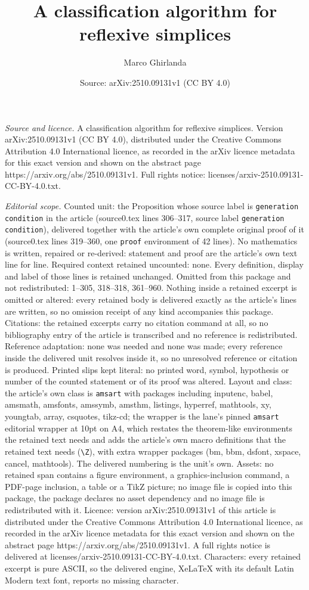 \documentclass[10pt,a4paper]{amsart}
\title[A classification algorithm for reflexive simplices]{A classification algorithm for reflexive simplices}
\author{Marco Ghirlanda}
\date{Source: arXiv:2510.09131v1 (CC BY 4.0)}
\begin{document}
\maketitle

\noindent\emph{Source and licence.} A classification algorithm for reflexive simplices. Version arXiv:2510.09131v1 (CC BY 4.0), distributed under the Creative Commons Attribution 4.0 International licence, as recorded in the arXiv licence metadata for this exact version and shown on the abstract page https://arxiv.org/abs/2510.09131v1. Full rights notice: licenses/arxiv-2510.09131-CC-BY-4.0.txt.\par\smallskip

\noindent\textit{Editorial scope.} Counted unit: the Proposition whose source label is \texttt{generation condition} in the article (source0.tex lines 306--317, source label \texttt{generation condition}), delivered together with the article's own complete original proof of it (source0.tex lines 319--360, one \texttt{proof} environment of 42 lines). No mathematics is written, repaired or re-derived: statement and proof are the article's own text line for line. Required context retained uncounted: none. Every definition, display and label of those lines is retained unchanged. Omitted from this package and not redistributed: 1--305, 318--318, 361--960. Nothing inside a retained excerpt is omitted or altered: every retained body is delivered exactly as the article's lines are written, so no omission receipt of any kind accompanies this package. Citations: the retained excerpts carry no citation command at all, so no bibliography entry of the article is transcribed and no reference is redistributed. Reference adaptation: none was needed and none was made; every reference inside the delivered unit resolves inside it, so no unresolved reference or citation is produced. Printed slips kept literal: no printed word, symbol, hypothesis or number of the counted statement or of its proof was altered. Layout and class: the article's own class is \texttt{amsart} with packages including inputenc, babel, amsmath, amsfonts, amssymb, amsthm, listings, hyperref, mathtools, xy, youngtab, array, csquotes, tikz-cd; the wrapper is the lane's pinned \texttt{amsart} editorial wrapper at 10pt on A4, which restates the theorem-like environments the retained text needs and adds the article's own macro definitions that the retained text needs (\texttt{\textbackslash Z}), with extra wrapper packages (bm, bbm, dsfont, xspace, cancel, mathtools). The delivered numbering is the unit's own. Assets: no retained span contains a figure environment, a graphics-inclusion command, a PDF-page inclusion, a table or a TikZ picture; no image file is copied into this package, the package declares no asset dependency and no image file is redistributed with it. Licence: version arXiv:2510.09131v1 of this article is distributed under the Creative Commons Attribution 4.0 International licence, as recorded in the arXiv licence metadata for this exact version and shown on the abstract page https://arxiv.org/abs/2510.09131v1. A full rights notice is delivered at licenses/arxiv-2510.09131-CC-BY-4.0.txt. Characters: every retained excerpt is pure ASCII, so the delivered engine, XeLaTeX with its default Latin Modern text font, reports no missing character.
\end{document}
